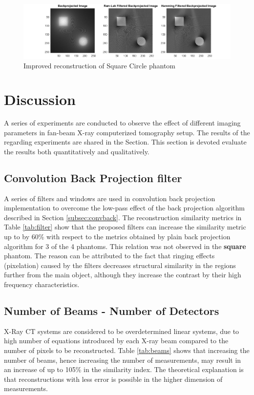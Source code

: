 \documentclass[journal]{IEEEtran}
\begin{document}
\begin{figure}[h]
	\centering
	\includegraphics[width=\columnwidth,height=.12\textheight]{images/sqcircimproved.png}
	\caption{Improved reconstruction of Square Circle phantom}\label{fig:sqcircimproved}
\end{figure}
\newpage
\section{Discussion} \label{sec:discuss}

A series of experiments are conducted to observe the effect of different imaging parameters in fan-beam X-ray computerized tomography setup. The results of the regarding experiments are shared in the  Section. This section is devoted evaluate the results both quantitatively and qualitatively.
\subsection{Convolution Back Projection filter}

A series of filters and windows are used in convolution back projection implementation to overcome the low-pass effect of the back projection algorithm described in Section \ref{subsec:convback}. The reconstruction similarity metrics in Table \ref{tab:filter} show that the proposed filters can increase the similarity metric up to by 60\% with respect to the metrics obtained by plain back projection algorithm for 3 of the 4 phantoms. This relation was not observed in the \textbf{square} phantom. The reason can be attributed to the fact that ringing effects (pixelation) caused by the filters decreases structural similarity in the regions further from the main object, although they increase the contrast by their high frequency characteristics. 
\subsection{Number of Beams - Number of Detectors} \label{subsec:beams}

X-Ray CT systems are considered to be overdetermined linear systems, due to high number of equations introduced by each X-ray beam compared to the number of pixels to be reconstructed. Table \ref{tab:beams} shows that increasing the number of beams, hence increasing the number of measurements, may result in an increase of up to 105\% in the similarity index. The theoretical explanation is that reconstructions with less error is possible in the higher dimension of measurements.
\end{document}
